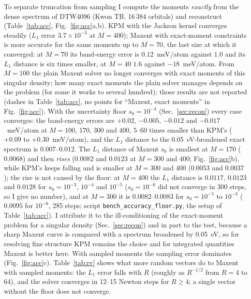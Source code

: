 \documentclass[reprint,nofootinbib,superscriptaddress,amsmath,amssymb,aps,prb,floatfix]{revtex4-2}
\begin{document}
To separate truncation from sampling I compute the moments \emph{exactly} from the dense spectrum of DTW4096 (Kwon TB, 16\,384 orbitals) and reconstruct (Table~\ref{tab:acc}, Fig.~\ref{fig:acc}a,b).
KPM with the Jackson kernel converges steadily ($L_1$ error $3.7\times10^{-3}$ at $M=400$); Maxent with exact-moment constraints is more accurate for the same moments up to $M=70$, the last size at which it converged: at $M=70$ its band-energy error is $0.12$~meV/atom against $1.0$ and its $L_1$ distance is six times smaller, at $M=40$ $1.6$ against $-18$~meV/atom.
From $M=100$ the plain Maxent solver no longer converges with exact moments of this singular density; how many exact moments the plain solver manages depends on the problem (for some it works to several hundred); those results are not reported (dashes in Table~\ref{tab:acc}, no points for ``Maxent, exact moments'' in Fig.~\ref{fig:acc}).
With the uncertainty floor $s_0=10^{-4}$ (Sec.~\ref{sec:recon}) every case converges: the band-energy errors are $+0.02$, $-0.005$, $-0.012$ and $-0.017$~meV/atom at $M=100$, 170, 300 and 400, 5--60 times smaller than KPM's ($+0.09$ to $+0.30$~meV/atom), and the $L_1$ distance to the 0.05~eV-broadened exact spectrum is 0.007--0.012.
The $L_1$ distance of Maxent $s_0$ is smallest at $M=170$ ($0.0068$) and then \emph{rises} ($0.0082$ and $0.0123$ at $M=300$ and 400; Fig.~\ref{fig:acc}b), while KPM's keeps falling and is smaller at $M=300$ and 400 ($0.0053$ and $0.0037$); the rise is not caused by the floor: at $M=400$ the $L_1$ distance is $0.0117$, $0.0123$ and $0.0128$ for $s_0=10^{-3}$, $10^{-4}$ and $10^{-5}$ ($s_0=10^{-6}$ did not converge in 300 steps, so I give no number), and at $M=300$ it is $0.0082$--$0.0083$ for $s_0=10^{-5}$ to $10^{-3}$ ($0.0095$ for $10^{-6}$, 285 steps; script \texttt{bench\_accuracy\_floor.py}, the setup of Table~\ref{tab:acc}). I attribute it to the ill-conditioning of the exact-moment problem for a singular density (Sec.~\ref{sec:recon}) and in part to the test, because a sharp Maxent curve is compared with a spectrum broadened by 0.05~eV, so for resolving fine structure KPM remains the choice and for integrated quantities Maxent is better here.
With sampled moments the sampling error dominates (Fig.~\ref{fig:acc}c). Table~\ref{tab:rv} shows what more random vectors do to Maxent with sampled moments: the $L_1$ error falls with $R$ (roughly as $R^{-1/2}$ from $R=4$ to 64), and the solver converges in 12--15 Newton steps for $R\ge4$; a single vector without the floor does not converge.
\end{document}
